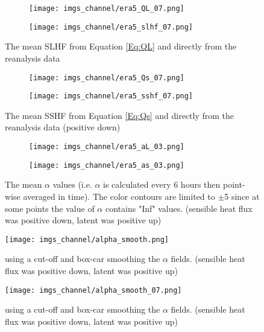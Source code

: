 \documentclass[12pt,a4paper]{article}
\begin{document}
\begin{figure}[h!]
\centering
\begin{subfigure}[t]{0.49\textwidth}
\texttt{[image: imgs\_channel/era5\_QL\_07.png]}
\end{subfigure}
\begin{subfigure}[t]{0.49\textwidth}
\texttt{[image: imgs\_channel/era5\_slhf\_07.png]}
\end{subfigure}
\caption{The mean SLHF from Equation \ref{Eq:QL} and directly from the reanalysis data}
\end{figure}

\begin{figure}[h!]
\centering
\begin{subfigure}[t]{0.49\textwidth}
\texttt{[image: imgs\_channel/era5\_Qs\_07.png]}
\end{subfigure}
\begin{subfigure}[t]{0.49\textwidth}
\texttt{[image: imgs\_channel/era5\_sshf\_07.png]}
\end{subfigure}
\caption{The mean SSHF from Equation \ref{Eq:Qs} and directly from the reanalysis data  (positive down)}
\end{figure}


\begin{figure}[h!]
\centering
\begin{subfigure}[t]{0.49\textwidth}
\texttt{[image: imgs\_channel/era5\_aL\_03.png]}
\end{subfigure}
\begin{subfigure}[t]{0.49\textwidth}
\texttt{[image: imgs\_channel/era5\_as\_03.png]}
\end{subfigure}
\caption{The mean $\alpha$ values (i.e. $\alpha$ is calculated every 6 hours then point-wise averaged in time). The color contours are limited to $\pm$5 since at some points the value of $\alpha$ contains "Inf" values. (sensible heat flux was positive down, latent was positive up)}
\end{figure}

\begin{figure}[h!]
\centering
\texttt{[image: imgs\_channel/alpha\_smooth.png]}
\caption{using a cut-off and box-car smoothing the $\alpha$ fields. (sensible heat flux was positive down, latent was positive up)}
\end{figure}

\begin{figure}[h!]
\centering
\texttt{[image: imgs\_channel/alpha\_smooth\_07.png]}
\caption{using a cut-off and box-car smoothing the $\alpha$ fields. (sensible heat flux was positive down, latent was positive up)}
\end{figure}
\end{document}
